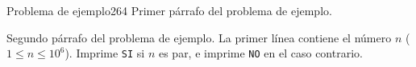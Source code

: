 \documentclass[12pt]{article}
\begin{document}
\begin{problem}{Problema de ejemplo}{2}{64}
    Primer párrafo del problema de ejemplo.

    Segundo párrafo del problema de ejemplo.
\probleminputformat
    La primer línea contiene el número $n$ ($1 \leq n \leq 10^6$).
\problemoutputformat
    Imprime \texttt{SI} si $n$ es par, e imprime \texttt{NO} en el caso contrario.
\problemexample
    
\end{problem}
\end{document}
